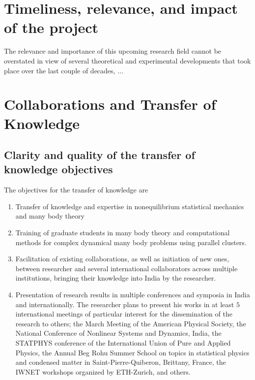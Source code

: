 \documentclass[a4paper,11pt,color]{article}
\begin{document}
\section{Timeliness, relevance, and impact of the project}
\label{sec:timeliness}
The relevance and importance of this upcoming research field cannot be overstated in view of several theoretical and experimental developments that took place over the last couple of decades, ...

\section{Collaborations and Transfer of Knowledge}
\label{sec:training}
\subsection{Clarity and quality of the transfer of knowledge objectives}
\label{sec:training_objectives}
The objectives for the transfer of knowledge are
\begin{enumerate}
 \item 
 Transfer of knowledge and expertise in nonequilibrium statistical mechanics and many body theory
 \item
 Training of graduate students in many body theory and computational methods for complex dynamical many body problems using parallel clusters.
 \item
 Facilitation of existing collaborations, as well as initiation of new ones,  between researcher and several international collaborators across multiple institutions, bringing their knowledge into India by the researcher.
 \item
 Presentation of research results in multiple conferences and symposia in India and internationally. The researcher plans to present his works in at least $5$ international meetings of particular interest for the dissemination of the research to others; the March Meeting of the American Physical Society, the National Conference of Nonlinear Systems and Dynamics, India, the STATPHYS conference of the  International Union of Pure and Applied Physics, the Annual Beg Rohu Summer School on topics in statistical physics and condensed matter in Saint-Pierre-Quiberon, Brittany, France, the IWNET workshops organized by ETH-Zurich, and others.
\end{enumerate}
\end{document}

